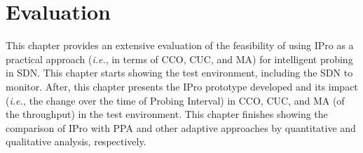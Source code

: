 \chapter{Evaluation}
\label{chapter:evaluation}
This chapter provides an extensive evaluation of the feasibility of using IPro as a practical approach (\textit{i.e.}, in terms of CCO, CUC, and MA) for intelligent probing in SDN. This chapter starts showing the test environment, including the SDN to monitor. After, this chapter presents the  IPro prototype developed and its impact (\textit{i.e.,} the change over the time of Probing Interval) in CCO, CUC, and MA (of the throughput) in the test environment. This chapter finishes showing the comparison of IPro with PPA and other adaptive approaches by quantitative and qualitative analysis, respectively.



